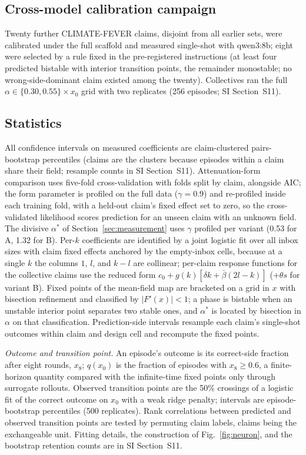 \documentclass[11pt]{article}
\newcommand{\astar}{\alpha^{*}}
\begin{document}
\subsection*{Cross-model calibration campaign}

Twenty further CLIMATE-FEVER claims, disjoint from all earlier sets, were
calibrated under the full scaffold and measured single-shot with qwen3:8b;
eight were selected by a rule fixed in the pre-registered instructions (at least four predicted bistable with interior transition points, the remainder
monostable; no wrong-side-dominant claim existed among the twenty).
Collectives ran the full $\alpha \in \{0.30, 0.55\} \times x_0$ grid with two
replicates (256 episodes; SI Section~S11).

\subsection*{Statistics}

All confidence intervals on measured coefficients are claim-clustered
pairs-bootstrap percentiles (claims are the clusters because episodes within
a claim share their field; resample counts in SI Section~S11).
Attenuation-form comparison uses five-fold cross-validation with folds split
by claim, alongside AIC; the form parameter is profiled on the full data
($\gamma = 0.9$) and re-profiled inside each training fold, with a held-out
claim's fixed effect set to zero, so the cross-validated likelihood scores
prediction for an unseen claim with an unknown field. The divisive $\astar$
of Section~\ref{sec:measurement} uses $\gamma$ profiled per variant (0.53 for
A, 1.32 for B). Per-$k$ coefficients are identified by a joint logistic fit
over all inbox sizes with claim fixed effects anchored by the empty-inbox
cells, because at a single $k$ the columns $1$, $l$, and $k - l$ are
collinear; per-claim response functions for the collective claims use the
reduced form $c_0 + g(k)[\delta k + \bar\beta(2l - k)]$ ($+\theta s$ for
variant B). Fixed points of the mean-field map are bracketed on a grid in $x$
with bisection refinement and classified by $|F'(x)| < 1$; a phase is
bistable when an unstable interior point separates two stable ones, and
$\astar$ is located by bisection in $\alpha$ on that classification.
Prediction-side intervals resample each claim's single-shot outcomes within
claim and design cell and recompute the fixed points.

\emph{Outcome and transition point.} An episode's outcome is its correct-side
fraction after eight rounds, $x_8$; $q(x_0)$ is the fraction of episodes with
$x_8 \ge 0.6$, a finite-horizon quantity compared with the infinite-time
fixed points only through surrogate rollouts. Observed transition points are the 50\% crossings of a logistic fit of the correct outcome on $x_0$ with a weak
ridge penalty; intervals are episode-bootstrap percentiles (500 replicates).
Rank correlations between predicted and observed transition points are tested by
permuting claim labels, claims being the exchangeable unit. Fitting details,
the construction of Fig.~\ref{fig:neuron}, and the bootstrap retention
counts are in SI Section~S11.
\end{document}
